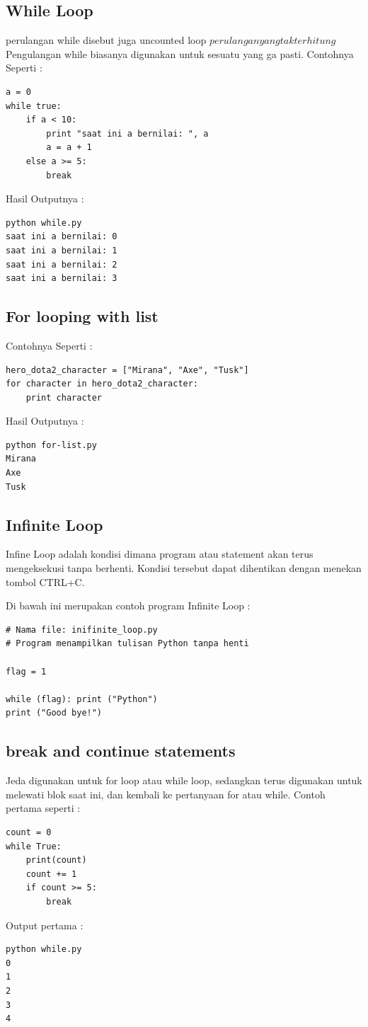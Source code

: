 \subsection{While Loop}
perulangan while disebut juga uncounted loop \(perulangan yang tak terhitung\)
Pengulangan while biasanya digunakan untuk sesuatu yang ga pasti.
Contohnya Seperti :
\begin{verbatim}
a = 0
while true:
	if a < 10:
		print "saat ini a bernilai: ", a
		a = a + 1
	else a >= 5:
		break
\end{verbatim}
Hasil Outputnya :
\begin{verbatim}
python while.py
saat ini a bernilai: 0
saat ini a bernilai: 1
saat ini a bernilai: 2
saat ini a bernilai: 3
\end{verbatim}

\subsection{For looping with list}
Contohnya Seperti :
\begin{verbatim}
hero_dota2_character = ["Mirana", "Axe", "Tusk"]
for character in hero_dota2_character:
	print character
\end{verbatim}
Hasil Outputnya :
\begin{verbatim}
python for-list.py
Mirana
Axe
Tusk
\end{verbatim}

\subsection{Infinite Loop}

Infine Loop adalah kondisi dimana program atau statement akan terus  mengeksekusi tanpa berhenti. Kondisi tersebut dapat dihentikan dengan menekan tombol CTRL+C.

Di bawah ini merupakan contoh program Infinite Loop :
\begin{verbatim}
# Nama file: inifinite_loop.py
# Program menampilkan tulisan Python tanpa henti

flag = 1

while (flag): print ("Python")
print ("Good bye!")
\end{verbatim}

\subsection{break and continue statements}
Jeda digunakan untuk for loop atau while loop, sedangkan terus digunakan untuk melewati blok saat ini, dan kembali ke pertanyaan for atau while.
Contoh pertama seperti :
\begin{verbatim}
count = 0
while True:
    print(count)
    count += 1
    if count >= 5:
        break
		\end{verbatim}
Output pertama :
\begin{verbatim}
python while.py
0
1
2
3
4
\end{verbatim}

